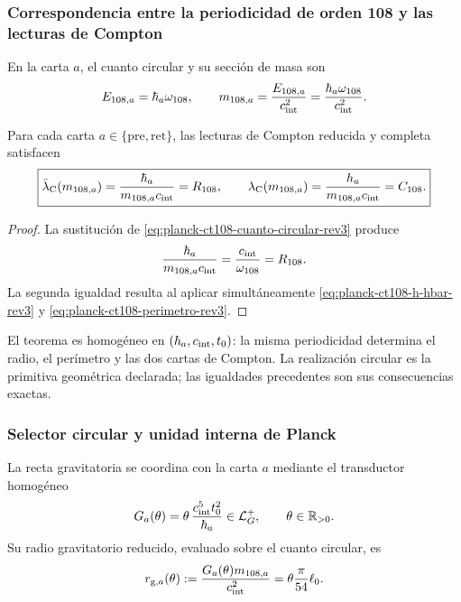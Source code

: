 \subsubsection{Correspondencia entre la periodicidad de orden 108 y las lecturas de Compton}

En la carta \(a\), el cuanto circular y su sección de masa son
\begin{equation}
 E_{108,a}=\hbar_a\omega_{108},
 \qquad
 m_{108,a}=\frac{E_{108,a}}{c_{\rm int}^{2}}
 =\frac{\hbar_a\omega_{108}}{c_{\rm int}^{2}}.
 \label{eq:planck-ct108-cuanto-circular-rev3}
\end{equation}

\begin{theorem}
\label{thm:planck-ct108-compton-rev3}
Para cada carta \(a\in\{\mathrm{pre},\mathrm{ret}\}\), las lecturas de
Compton reducida y completa satisfacen
\begin{equation}
 \boxed{
 \bar\lambda_{\rm C}(m_{108,a})
 =\frac{\hbar_a}{m_{108,a}c_{\rm int}}=R_{108},
 \qquad
 \lambda_{\rm C}(m_{108,a})
 =\frac{h_a}{m_{108,a}c_{\rm int}}=C_{108}.}
 \label{eq:planck-ct108-identidad-compton-rev3}
\end{equation}
\end{theorem}

\begin{proof}
La sustitución de
\eqref{eq:planck-ct108-cuanto-circular-rev3} produce
\[
 \frac{\hbar_a}{m_{108,a}c_{\rm int}}
 =\frac{c_{\rm int}}{\omega_{108}}=R_{108}.
\]
La segunda igualdad resulta al aplicar simultáneamente
\eqref{eq:planck-ct108-h-hbar-rev3} y
\eqref{eq:planck-ct108-perimetro-rev3}.
\end{proof}

El teorema es homogéneo en
\((\hbar_a,c_{\rm int},t_0)\): la misma periodicidad determina el radio,
el perímetro y las dos cartas de Compton. La realización circular es la
primitiva geométrica declarada; las igualdades precedentes son sus
consecuencias exactas.

\subsubsection{Selector circular y unidad interna de Planck}

La recta gravitatoria se coordina con la carta \(a\) mediante el transductor
homogéneo
\begin{equation}
 G_a(\theta)=\theta\,
 \frac{c_{\rm int}^{5}t_0^2}{\hbar_a}
 \in\mathcal L_G^+,
 \qquad \theta\in\mathbb R_{>0}.
 \label{eq:planck-ct108-transductor-rev3}
\end{equation}
Su radio gravitatorio reducido, evaluado sobre el cuanto circular, es
\begin{equation}
 r_{{\rm g},a}(\theta)
 :=\frac{G_a(\theta)m_{108,a}}{c_{\rm int}^{2}}
 =\theta\frac{\pi}{54}\ell_0.
 \label{eq:planck-ct108-radio-gravitatorio-rev3}
\end{equation}

